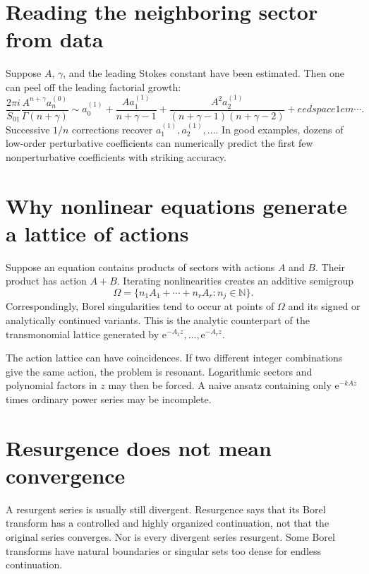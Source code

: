 \documentclass[11pt,oneside]{book}
\theoremstyle{definition}
\theoremstyle{remark}
\newcommand{\N}{\mathbb{N}}
\newcommand{\e}{\mathrm{e}}
\begin{document}
\section{Reading the neighboring sector from data}

Suppose $A$, $\gamma$, and the leading Stokes constant have been estimated. Then
one can peel off the leading factorial growth:
\[
  \frac{2\pi i}{S_{01}}
  \frac{A^{n+\gamma}a_n^{(0)}}{\Gamma(n+\gamma)}
  \sim a_0^{(1)}
  +\frac{A a_1^{(1)}}{n+\gamma-1}
  +\frac{A^2a_2^{(1)}}{(n+\gamma-1)(n+\gamma-2)}+
eedspace{1em}\cdots.
\]
Successive $1/n$ corrections recover $a_1^{(1)},a_2^{(1)},\ldots$. In good
examples, dozens of low-order perturbative coefficients can numerically predict
the first few nonperturbative coefficients with striking accuracy.

\section{Why nonlinear equations generate a lattice of actions}

Suppose an equation contains products of sectors with actions $A$ and $B$.
Their product has action $A+B$. Iterating nonlinearities creates an additive
semigroup
\[
  \Omega=\{n_1A_1+\cdots+n_rA_r:n_j\in\N\}.
\]
Correspondingly, Borel singularities tend to occur at points of $\Omega$ and
its signed or analytically continued variants. This is the analytic counterpart
of the transmonomial lattice generated by
$\e^{-A_1z},\ldots,\e^{-A_rz}$.

\begin{warningbox}
The action lattice can have coincidences. If two different integer combinations
give the same action, the problem is resonant. Logarithmic sectors and polynomial
factors in $z$ may then be forced. A naive ansatz containing only
$\e^{-kAz}$ times ordinary power series may be incomplete.
\end{warningbox}

\section{Resurgence does not mean convergence}

A resurgent series is usually still divergent. Resurgence says that its Borel
transform has a controlled and highly organized continuation, not that the
original series converges. Nor is every divergent series resurgent. Some Borel
transforms have natural boundaries or singular sets too dense for endless
continuation.
\end{document}
